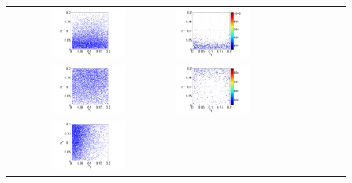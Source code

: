  \begin{figure}[ht]
        \begin{tabular}{clc}
\includegraphics[width=0.475\textwidth]{./figures/sample12.pdf} &
\includegraphics[width=0.475\textwidth]{./figures/jpdf12.pdf} \\
\includegraphics[width=0.475\textwidth]{./figures/sample13.pdf} &
\includegraphics[width=0.475\textwidth]{./figures/jpdf13.pdf} \\
\includegraphics[width=0.475\textwidth]{./figures/sample23.pdf} &

\end{tabular}
\end{figure}
